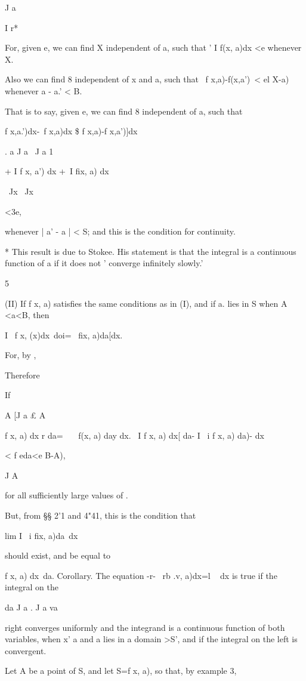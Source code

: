 J a

I r*

For, given e, we can find X independent of a, such that ' I f(x, a)dx
<e whenever X.

Also we can find 8 independent of x and a, such that \ f x,a)-f(x,a')\
< el X-a) whenever a - a.' < B.

That is to say, given e, we can find 8 independent of a, such that

f x,a.')dx-\ f x,a)dx \$ f x,a)-f x,a')]dx\

. a J a \ J a 1

+ I f x, a') dx +\ I fix, a) dx

\ Jx \ Jx

<3e,

whenever | a' - a | < S; and this is the condition for continuity.

* This result is due to Stokee. His statement is that the integral is
a continuous function of a if it does not ' converge infinitely
slowly.'

5

%
%

(II) If f x, a) satisfies the same conditions as in (I), and if a.
lies in S when A <a<B, then

I \ f x, (x)dx\ doi= \ fix, a)da[dx.

For, by ,

Therefore

If

A [J a £ A

f x, a) dx r da= \ \ \ f(x, a) day dx. \ I f x, a) dx[ da- I \ i f x,
a) da)- dx

< f eda<e B-A),

J A

for all sufficiently large values of .

But, from §§ 2'1 and 4"41, this is the condition that

lim I \ i fix, a)da\ dx

should exist, and be equal to

f x, a) dx\ da. Corollary. The equation -r- \ rb .v, a)dx=l ~ dx is
true if the integral on the

da J a . J a va

right converges uniformly and the integrand is a continuous function
of both variables, when x' a and a lies in a domain >S', and if the
integral on the left is convergent.

Let A be a point of S, and let S=f x, a), so that, by  example
3,

